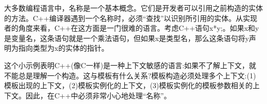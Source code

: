 大多数编程语言中，名称是一个基本概念。它们是开发者可以引用之前构造的实体的方法。C++编译器遇到一个名称时，必须“查找”以识别所引用的实体。从实现者的角度来看，C++在这方面是一门很难的语言。考虑C++语句x*y;。如果x和y是变量名，这条语句就是一个乘法语句，但如果x是类型名，那么这条语句将y声明为指向类型为x的实体的指针。

这个小示例表明C++(像C一样)是一种上下文敏感的语言:如果不了解上下文，就不能总是理解一个构造。这与模板有什么关系?模板构造必须处理多个上下文:(1)模板出现的上下文，(2)模板实例化的上下文，(3)模板实例化的模板参数相关的上下文。因此，在C++中必须非常小心地处理“名称”。